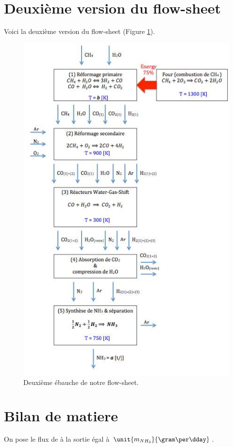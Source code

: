 \documentclass{article}
\begin{document}
	\section{Deuxième version du flow-sheet}
	Voici la deuxième version du flow-sheet (Figure \ref{flow-sheet-v2}).
	
	\begin{figure}[htb!]
	\centering
	\includegraphics[scale=0.80]{flow-sheet-v2.jpg}
	\caption{Deuxième ébauche de notre flow-sheet.}
	\label{flow-sheet-v2}
	\end{figure}

\section{Bilan de matiere}
On pose le flux de  à la sortie égal à $\unit{m_{NH_3}}{\gram\per\dday}$. 
\end{document}
